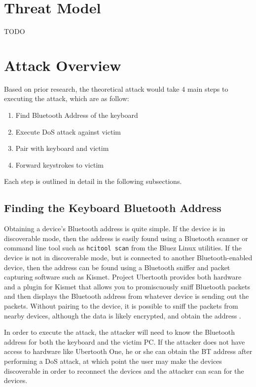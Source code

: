 \documentclass{acm_proc_article-sp}
\begin{document}
\section{Threat Model}
TODO

\section{Attack Overview}
Based on prior research, the theoretical attack would take 4 main steps to executing the attack, which are as follow:
\begin{enumerate}
\item Find Bluetooth Address of the keyboard
\item Execute DoS attack against victim
\item Pair with keyboard and victim
\item Forward keystrokes to victim
\end{enumerate}

Each step is outlined in detail in the following subsections.

\subsection{Finding the Keyboard Bluetooth Address}
Obtaining a device's Bluetooth address is quite simple. If the device is in discoverable mode, then the address is easily found using a Bluetooth scanner or command line tool such as \texttt{hcitool scan} from the Bluez Linux utilities. If the device is not in discoverable mode, but is connected to another Bluetooth-enabled device, then the address can be found using a Bluetooth sniffer and packet capturing software such as Kismet\cite{kismet}. Project Ubertooth \cite{ubertooth} provides both hardware and a plugin for Kismet that allows you to promiscuously sniff Bluetooth packets and then displays the Bluetooth address from whatever device is sending out the packets. Without pairing to the device, it is possible to sniff the packets from nearby devices, although the data is likely encrypted, and obtain the address \cite{hak5}. 

In order to execute the attack, the attacker will need to know the Bluetooth address for both the keyboard and the victim PC. If the attacker does not have access to hardware like Ubertooth One, he or she can obtain the BT address after performing a DoS attack, at which point the user may make the devices discoverable in order to reconnect the devices and the attacker can scan for the devices. 
\end{document}
